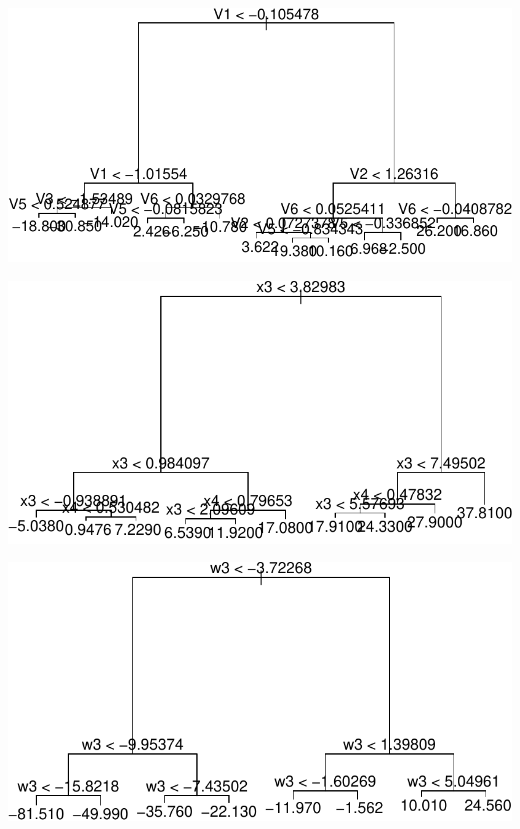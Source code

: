 \documentclass[12pt,twoside]{reedthesis}
\begin{document}
  \begin{center}\includegraphics{Thesis_files/figure-latex/unnamed-chunk-1-1} \end{center}
  
  \begin{center}\includegraphics{Thesis_files/figure-latex/unnamed-chunk-1-2} \end{center}
  
  \begin{center}\includegraphics{Thesis_files/figure-latex/unnamed-chunk-1-3} \end{center}
  
\end{document}
